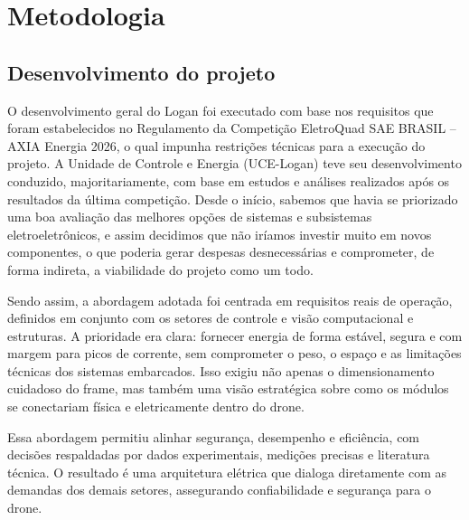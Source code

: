 \section{Metodologia}
\subsection{Desenvolvimento do projeto}
O desenvolvimento geral do Logan foi executado com base nos requisitos que foram estabelecidos no Regulamento da Competição EletroQuad SAE BRASIL – AXIA Energia 2026, o qual impunha restrições técnicas para a execução do projeto. A Unidade de Controle e Energia (UCE-Logan) teve seu desenvolvimento conduzido, majoritariamente, com base em estudos e análises realizados após os resultados da última competição. Desde o início, sabemos que havia se priorizado uma boa avaliação das melhores opções de sistemas e subsistemas eletroeletrônicos, e assim decidimos que não iríamos investir muito em novos componentes, o que poderia gerar despesas desnecessárias e comprometer, de forma indireta, a viabilidade do projeto como um todo.

Sendo assim, a abordagem adotada foi centrada em requisitos reais de operação, definidos em conjunto com os setores de controle e visão computacional e estruturas. A prioridade era clara: fornecer energia de forma estável, segura e com margem para picos de corrente, sem comprometer o peso, o espaço e as limitações técnicas dos sistemas embarcados. Isso exigiu não apenas o dimensionamento cuidadoso do frame, mas também uma visão estratégica sobre como os módulos se conectariam física e eletricamente dentro do drone.

Essa abordagem permitiu alinhar segurança, desempenho e eficiência, com decisões respaldadas por dados experimentais, medições precisas e literatura técnica. O resultado é uma arquitetura elétrica que dialoga diretamente com as demandas dos demais setores, assegurando confiabilidade e segurança para o drone.

